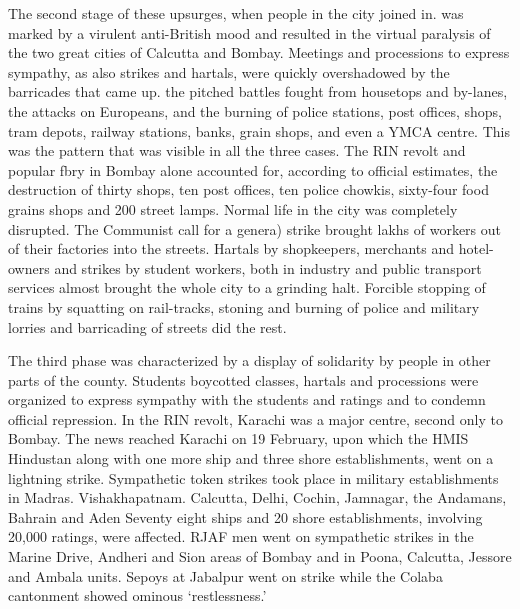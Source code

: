 The second stage of these upsurges, when people in the city joined in. was marked by a virulent anti-British mood and resulted in the virtual paralysis of the two great cities of Calcutta and Bombay. Meetings and processions to express sympathy, as also strikes and hartals, were quickly overshadowed by the barricades that came up. the pitched battles fought from housetops and by-lanes, the attacks on Europeans, and the burning of police stations, post offices, shops, tram depots, railway stations, banks, grain shops, and even a YMCA centre. This was the pattern that was visible in all the three cases. The RIN revolt and popular fbry in Bombay alone accounted for, according to official estimates, the destruction of thirty shops, ten post offices, ten police chowkis, sixty-four food grains shops and 200 street lamps. Normal life in the city was completely disrupted. The Communist call for a genera) strike brought lakhs of workers out of their factories into the streets. Hartals by shopkeepers, merchants and hotel-owners and strikes by student workers, both in industry and public transport services almost brought the whole city to a grinding halt. Forcible stopping of trains by squatting on rail-tracks, stoning and burning of police and military lorries and barricading of streets did the rest. 

The third phase was characterized by a display of solidarity by people in other parts of the county. Students boycotted classes, hartals and processions were organized to express sympathy with the students and ratings and to condemn official repression. In the RIN revolt, Karachi was a major centre, second only to Bombay. The news reached Karachi on 19 February, upon which the HMIS Hindustan along with one more ship and three shore establishments, went on a lightning strike. Sympathetic token strikes took place in military establishments in Madras. Vishakhapatnam. Calcutta, Delhi, Cochin, Jamnagar, the Andamans, Bahrain and Aden Seventy eight ships and 20 shore establishments, involving 20,000 ratings, were affected. RJAF men went on sympathetic strikes in the Marine Drive, Andheri and Sion areas of Bombay and in Poona, Calcutta, Jessore and Ambala units. Sepoys at Jabalpur went on strike while the Colaba cantonment showed ominous ‘restlessness.’ 

